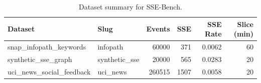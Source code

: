 \begin{table}[t]
\centering
\caption{Dataset summary for SSE-Bench.}
\label{tab:ssebench\_dataset\_summary}
\begin{tabular}{llrrrr}
\toprule
Dataset & Slug & Events & SSE & SSE Rate & Slice (min) \\
\midrule
snap\_infopath\_keywords & infopath & 60000 & 371 & 0.0062 & 60 \\
synthetic\_sse\_graph & synthetic\_sse & 20000 & 565 & 0.0283 & 20 \\
uci\_news\_social\_feedback & uci\_news & 260515 & 1507 & 0.0058 & 20 \\
\bottomrule
\end{tabular}
\end{table}
